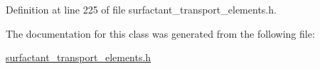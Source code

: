 Definition at line 225 of file surfactant\+\_\+transport\+\_\+elements.\+h.



The documentation for this class was generated from the following file\+:\begin{DoxyCompactItemize}
\item 
\hyperlink{surfactant__transport__elements_8h}{surfactant\+\_\+transport\+\_\+elements.\+h}\end{DoxyCompactItemize}
